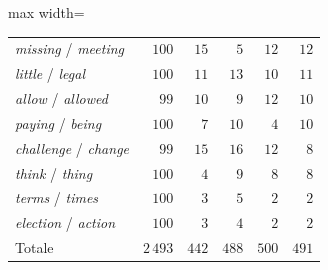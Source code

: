 \begin{table}[ht]
\begin{adjustbox}{max width=\textwidth}
\begin{tabular}{@{}l r r r r r@{}}
\emph{missing} / \emph{meeting} & $100$ & $15$ & $5$ & $12$ & $12$ \\
\emph{little} / \emph{legal} & $100$ & $11$ & $13$ & $10$ & $11$ \\
\emph{allow} / \emph{allowed} & $99$ & $10$ & $9$ & $12$ & $10$ \\
\emph{paying} / \emph{being} & $100$ & $7$ & $10$ & $4$ & $10$ \\
\emph{challenge} / \emph{change} & $99$ & $15$ & $16$ & $12$ & $8$ \\
\emph{think} / \emph{thing} & $100$ & $4$ & $9$ & $8$ & $8$ \\
\emph{terms} / \emph{times} & $100$ & $3$ & $5$ & $2$ & $2$ \\
\emph{election} / \emph{action} & $100$ & $3$ & $4$ & $2$ & $2$ \\
\hline
Totale & $2\,493$ & $442$ & $488$ & $500$ & $491$ \\
\hline
\end{tabular}
\end{adjustbox}
\end{table}
